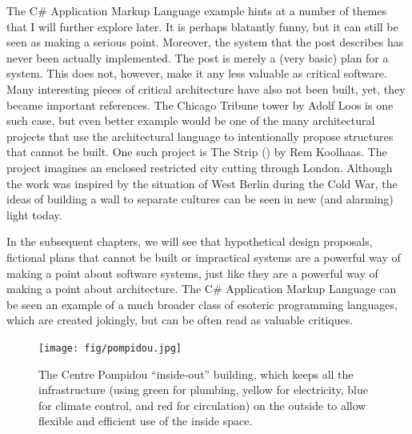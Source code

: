 The C\# Application Markup Language example hints at a number of themes that I will further
explore later. It is perhaps blatantly funny, but it can still be seen as making a serious point.
Moreover, the system that the post describes has never been actually implemented. The post
is merely a (very basic) plan for a system. This does not, however, make it any less valuable
as critical software. Many interesting pieces of critical architecture have also not been
built, yet, they became important references. The Chicago Tribune tower by Adolf Loos is one
such case, but even better example would be one of the many architectural projects that
use the architectural language to intentionally propose structures that cannot be built.
One such project is The Strip () by Rem Koolhaas. The project imagines
an enclosed restricted city cutting through London. Although the work was inspired by the
situation of West Berlin during the Cold War, the ideas of building a wall to separate cultures
can be seen in new (and alarming) light today.

In the subsequent chapters, we will see that hypothetical design proposals, fictional
plans that cannot be built or impractical systems are a powerful way of making a point
about software systems, just like they are a powerful way of making a point about architecture.
The C\# Application Markup Language can be seen an example of a much broader class of
esoteric programming languages, which are created jokingly, but can be often read as
valuable critiques.

\begin{figure}
\centering
\texttt{[image: fig/pompidou.jpg]}\quad
\caption{The Centre Pompidou ``inside-out'' building, which keeps all the infrastructure
(using green for plumbing, yellow for electricity, blue for climate control, and red for
circulation) on the outside to allow flexible and efficient use of the inside space.}
\label{fig:pompidou}
\end{figure}

